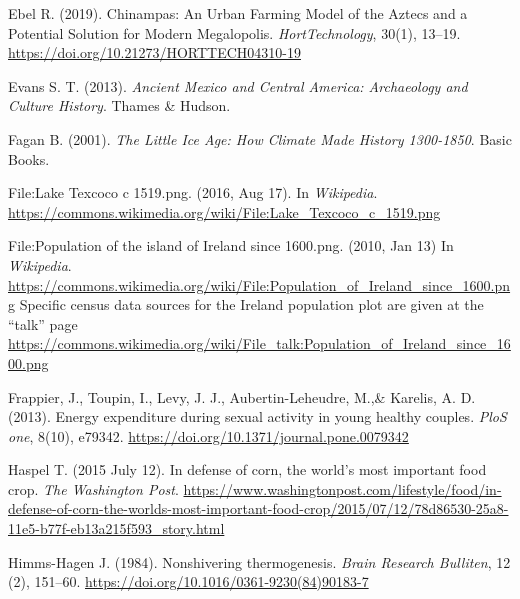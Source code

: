 \documentclass[man]{apa7}
\begin{document}
\begin{thebibliography}{99}
Ebel R. 
(2019).
Chinampas: An Urban Farming Model of the Aztecs and a Potential Solution for Modern Megalopolis.
\textit{HortTechnology},
30(1), 13--19.
\url{https://doi.org/10.21273/HORTTECH04310-19}

Evans S. T.
(2013).
\textit{Ancient Mexico and Central America: Archaeology and Culture History}.
Thames \& Hudson.

Fagan B.
(2001).
\textit{The Little Ice Age: How Climate Made History 1300-1850}.
Basic Books.

File:Lake Texcoco c 1519.png.
(2016, Aug 17).
In \textit{Wikipedia}.
\url{https://commons.wikimedia.org/wiki/File:Lake\_Texcoco\_c\_1519.png}


File:Population of the island of Ireland since 1600.png.
(2010, Jan 13)
In \textit{Wikipedia}.
\url{https://commons.wikimedia.org/wiki/File:Population\_of\_Ireland\_since\_1600.png}
Specific census data sources for the Ireland population plot are given at the ``talk'' page 
\url{https://commons.wikimedia.org/wiki/File\_talk:Population\_of\_Ireland\_since\_1600.png}


Frappier, J., Toupin, I., Levy, J. J., Aubertin-Leheudre, M.,\& Karelis, A. D. 
(2013). 
Energy expenditure during sexual activity in young healthy couples. 
\textit{PloS one}, 8(10), e79342. 
\url{https://doi.org/10.1371/journal.pone.0079342}

Haspel T.
(2015 July 12). 
In defense of corn, the world’s most important food crop.
\textit{The Washington Post}.
\url{https://www.washingtonpost.com/lifestyle/food/in-defense-of-corn-the-worlds-most-important-food-crop/2015/07/12/78d86530-25a8-11e5-b77f-eb13a215f593_story.html}

Himms-Hagen J.
(1984).
Nonshivering thermogenesis. 
\textit{Brain Research Bulliten},
12 (2),
151--60.
\url{https://doi.org/10.1016/0361-9230(84)90183-7}


\end{thebibliography}
\end{document}
